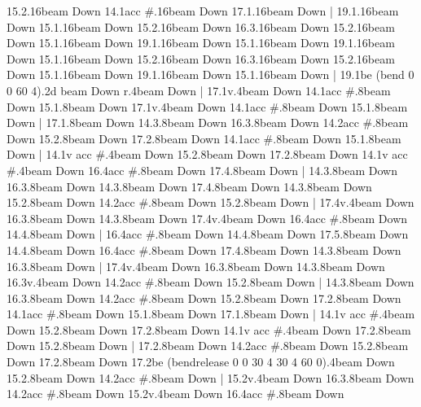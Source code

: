       15.2.16{beam Down}
      14.1{acc #}.16{beam Down}
      17.1.16{beam Down}
    |
      19.1.16{beam Down}
      15.1.16{beam Down}
      15.2.16{beam Down}
      16.3.16{beam Down}
      15.2.16{beam Down}
      15.1.16{beam Down}
      19.1.16{beam Down}
      15.1.16{beam Down}
      19.1.16{beam Down}
      15.1.16{beam Down}
      15.2.16{beam Down}
      16.3.16{beam Down}
      15.2.16{beam Down}
      15.1.16{beam Down}
      19.1.16{beam Down}
      15.1.16{beam Down}
    |
      19.1{be (bend 0 0 60 4)}.2{d beam Down}
      r.4{beam Down}
    |
      17.1{v}.4{beam Down}
      14.1{acc #}.8{beam Down}
      15.1.8{beam Down}
      17.1{v}.4{beam Down}
      14.1{acc #}.8{beam Down}
      15.1.8{beam Down}
    |
      17.1.8{beam Down}
      14.3.8{beam Down}
      16.3.8{beam Down}
      14.2{acc #}.8{beam Down}
      15.2.8{beam Down}
      17.2.8{beam Down}
      14.1{acc #}.8{beam Down}
      15.1.8{beam Down}
    |
      14.1{v acc #}.4{beam Down}
      15.2.8{beam Down}
      17.2.8{beam Down}
      14.1{v acc #}.4{beam Down}
      16.4{acc #}.8{beam Down}
      17.4.8{beam Down}
    |
      14.3.8{beam Down}
      16.3.8{beam Down}
      14.3.8{beam Down}
      17.4.8{beam Down}
      14.3.8{beam Down}
      15.2.8{beam Down}
      14.2{acc #}.8{beam Down}
      15.2.8{beam Down}
    |
      17.4{v}.4{beam Down}
      16.3.8{beam Down}
      14.3.8{beam Down}
      17.4{v}.4{beam Down}
      16.4{acc #}.8{beam Down}
      14.4.8{beam Down}
    |
      16.4{acc #}.8{beam Down}
      14.4.8{beam Down}
      17.5.8{beam Down}
      14.4.8{beam Down}
      16.4{acc #}.8{beam Down}
      17.4.8{beam Down}
      14.3.8{beam Down}
      16.3.8{beam Down}
    |
      17.4{v}.4{beam Down}
      16.3.8{beam Down}
      14.3.8{beam Down}
      16.3{v}.4{beam Down}
      14.2{acc #}.8{beam Down}
      15.2.8{beam Down}
    |
      14.3.8{beam Down}
      16.3.8{beam Down}
      14.2{acc #}.8{beam Down}
      15.2.8{beam Down}
      17.2.8{beam Down}
      14.1{acc #}.8{beam Down}
      15.1.8{beam Down}
      17.1.8{beam Down}
    |
      14.1{v acc #}.4{beam Down}
      15.2.8{beam Down}
      17.2.8{beam Down}
      14.1{v acc #}.4{beam Down}
      17.2.8{beam Down}
      15.2.8{beam Down}
    |
      17.2.8{beam Down}
      14.2{acc #}.8{beam Down}
      15.2.8{beam Down}
      17.2.8{beam Down}
      17.2{be (bendrelease 0 0 30 4 30 4 60 0)}.4{beam Down}
      15.2.8{beam Down}
      14.2{acc #}.8{beam Down}
    |
      15.2{v}.4{beam Down}
      16.3.8{beam Down}
      14.2{acc #}.8{beam Down}
      15.2{v}.4{beam Down}
      16.4{acc #}.8{beam Down}
